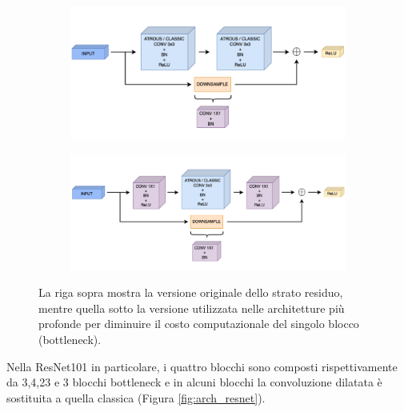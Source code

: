 \begin{figure}[h!]
 \centering
 \begin{subfigure}[b]{0.88\textwidth}
     \centering
     \includegraphics[width=\textwidth]{img/res_block_2.png}
     \caption{}
     \label{}
 \end{subfigure}
 \hfill
 \begin{subfigure}[b]{0.96\textwidth}
     \centering
     \includegraphics[width=\textwidth]{img/bottleneck_2.png}
     \caption{}
     \label{fig:bottleneck}
 \end{subfigure}
    \caption{La riga sopra mostra la versione originale dello strato residuo, mentre quella sotto la versione utilizzata nelle architetture più profonde per diminuire il costo computazionale del singolo blocco (bottleneck).}
    \label{fig:comparison_res_bottleneck}
\end{figure}


 Nella ResNet101 in particolare, i quattro blocchi sono composti rispettivamente da 3,4,23 e 3 blocchi bottleneck e in alcuni blocchi la convoluzione dilatata è sostituita a quella classica (Figura \ref{fig:arch_resnet}). 

